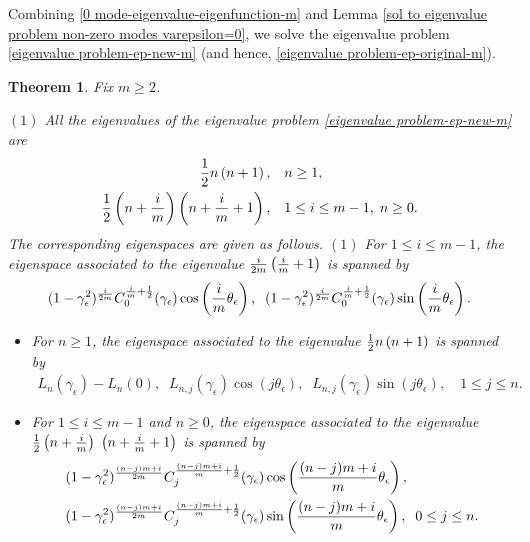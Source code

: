 \documentclass[1 [leqno, 11pt]{amsart}
\numberwithin{equation}{section}
\let\ep=\epsilon
\newtheorem{Theorem}{Theorem}[section]
\begin{document}
\begin{CJK*}{GBK}{song}
Combining \eqref{0 mode-eigenvalue-eigenfunction-m} and Lemma \ref{sol to eigenvalue problem non-zero modes varepsilon=0}, we solve
the eigenvalue problem \eqref{eigenvalue problem-ep-new-m} (and hence, \eqref{eigenvalue problem-ep-original-m}).
\begin{Theorem}\label{sol to eigenvalue problem varepsilon=0-pde} Fix $m\geq2$.

$(1)$
All the eigenvalues  of the eigenvalue problem \eqref{eigenvalue problem-ep-new-m} are
\begin{align}\label{km-eigenvalues}
{1\over2}n\left(n+1\right), &\quad n\geq1,\\\label{nonkm-eigenvalues}
{1\over2}\left(n+{i\over m}\right)\left( n+{i\over m}+1\right), &\quad 1\leq i\leq m-1,\; n\geq0.
\end{align} The corresponding eigenspaces are given as follows.
$(1)$ For $1\leq i\leq m-1$, the  eigenspace associated to the eigenvalue  ${i\over 2m}\left({i\over m}+1\right)$ is spanned by
 \begin{align*}
 (1-\gamma_\ep^2)^{i\over2m}C_0^{{i\over m}+{1\over2}}(\gamma_\ep)\cos\left({i\over m}\theta_\ep\right),\;\;(1-\gamma_\ep^2)^{i\over2m}C_0^{{i\over m}+{1\over2}}(\gamma_\ep)\sin\left({i\over m}\theta_\ep\right).
 \end{align*}
 \fi
 \begin{itemize}
 \item For $n\geq1$,
the eigenspace associated to the eigenvalue  ${1\over2}n\left( n+1\right)$ is spanned by
 \begin{align}\label{km-eigenfunctions}
L_{n}(\gamma_\ep)-L_{n}(0),\;\; L_{n,j}(\gamma_\ep)\cos(j\theta_\ep),\;\;
 L_{n,j}(\gamma_\ep)\sin(j\theta_\ep), \quad  1 \leq j\leq n.
 \end{align}

\item For $1\leq i\leq m-1$ and $n\geq0$,
the eigenspace associated to the eigenvalue  ${1\over2}\left(n+{i\over m}\right)$ $\left( n+{i\over m}+1\right)$ is spanned by
\begin{align}\nonumber
 &(1-\gamma_\ep^2)^{(n-j)m+i\over2m}C_j^{{(n-j)m+i\over m}+{1\over2}}(\gamma_\ep)\cos\left({(n-j)m+i\over m}\theta_\ep\right),\\\label{nonkm-eigenfunctions}
 &(1-\gamma_\ep^2)^{(n-j)m+i\over2m}C_j^{{(n-j)m+i\over m}+{1\over2}}(\gamma_\ep)\sin\left({(n-j)m+i\over m}\theta_\ep\right),\;\;0\leq j\leq n.
 \end{align}
 \end{itemize}


\end{Theorem}
\end{CJK*}
\end{document}
